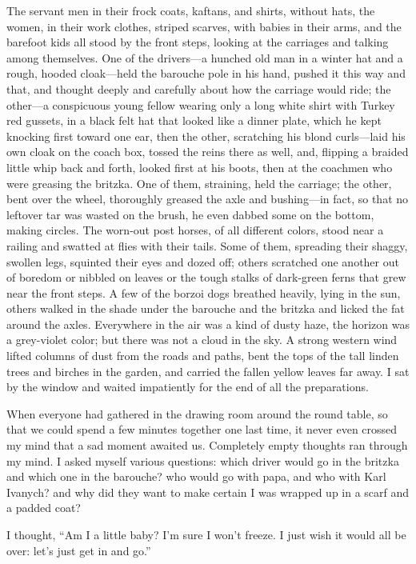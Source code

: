 The servant men in their frock coats, kaftans, and shirts, without hats, the women, in their work clothes, striped scarves, with babies in their arms, and the barefoot kids all stood by the front steps, looking at the carriages and talking among themselves. One of the drivers---a hunched old man in a winter hat and a rough, hooded cloak---held the barouche pole in his hand, pushed it this way and that, and thought deeply and carefully about how the carriage would ride; the other---a conspicuous young fellow wearing only a long white shirt with Turkey red gussets, in a black felt hat that looked like a dinner plate, which he kept knocking first toward one ear, then the other, scratching his blond curls---laid his own cloak on the coach box, tossed the reins there as well, and, flipping a braided little whip back and forth, looked first at his boots, then at the coachmen who were greasing the britzka. One of them, straining, held the carriage;  the other, bent over the wheel, thoroughly greased the axle and bushing---in fact, so that no leftover tar was wasted on the brush, he even dabbed some on the bottom, making circles. The worn-out post horses, of all different colors, stood near a railing and swatted at flies with their tails. Some of them, spreading their shaggy, swollen legs, squinted their eyes and dozed off; others scratched one another out of boredom or nibbled on leaves or the tough stalks of dark-green ferns that grew near the front steps. A few of the borzoi dogs breathed heavily, lying in the sun, others walked in the shade under the barouche and the britzka and licked the fat around the axles. Everywhere in the air was a kind of dusty haze, the horizon was a grey-violet color; but there was not a cloud in the sky. A strong western wind lifted columns of dust from the roads and paths, bent the tops of the tall linden trees and birches in the garden, and carried the fallen yellow leaves far away. I sat by the window and waited impatiently for the end of all the preparations.

When everyone had gathered in the drawing room around the round table, so that we could spend a few minutes together one last time, it never even crossed my mind that a sad moment awaited us. Completely empty thoughts ran through my mind. I asked myself various questions: which driver would go in the britzka and which one in the barouche? who would go with papa, and who with Karl Ivanych? and why did they want to make certain I was wrapped up in a scarf and a padded coat?

I thought, ``Am I a little baby? I'm sure I won't freeze. I just wish it would all be over: let's just get in and go.'' %

